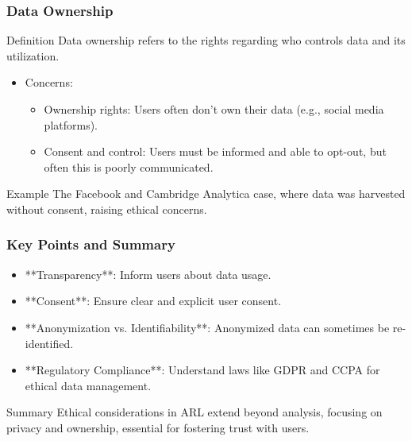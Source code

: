 \documentclass{beamer}
\begin{document}
\begin{frame}[fragile]
    \frametitle{Data Ownership}
    \begin{block}{Definition}
        Data ownership refers to the rights regarding who controls data and its utilization.
    \end{block}
    \begin{itemize}
        \item Concerns:
        \begin{itemize}
            \item Ownership rights: Users often don’t own their data (e.g., social media platforms).
            \item Consent and control: Users must be informed and able to opt-out, but often this is poorly communicated.
        \end{itemize}
    \end{itemize}
    
    \begin{block}{Example}
        The Facebook and Cambridge Analytica case, where data was harvested without consent, raising ethical concerns.
    \end{block}
\end{frame}

\begin{frame}[fragile]
    \frametitle{Key Points and Summary}
    \begin{itemize}
        \item **Transparency**: Inform users about data usage.
        \item **Consent**: Ensure clear and explicit user consent.
        \item **Anonymization vs. Identifiability**: Anonymized data can sometimes be re-identified.
        \item **Regulatory Compliance**: Understand laws like GDPR and CCPA for ethical data management.
    \end{itemize}
    
    \begin{block}{Summary}
        Ethical considerations in ARL extend beyond analysis, focusing on privacy and ownership, essential for fostering trust with users.
    \end{block}
\end{frame}
\end{document}

